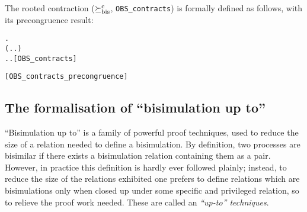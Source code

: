 The rooted contraction ($\mathrel{\succeq^{\rm{c}}_{\rm{bis}}}$, \texttt{OBS_contracts}) is formally
defined as follows, with its precongruence result:
\begin{alltt}
 \HOLSymConst{\HOLTokenObsContracts}  \HOLSymConst{\HOLTokenDefEquality{}}
  \HOLSymConst{\HOLTokenForall{}}.
      (\HOLSymConst{\HOLTokenForall{}}.  \HOLTokenTransBegin{}\HOLTokenTransEnd {} \HOLSymConst{\HOLTokenImp{}} \HOLSymConst{\HOLTokenExists{}}.  \HOLTokenTransBegin{}\HOLTokenTransEnd {} \HOLSymConst{\HOLTokenConj{}}  \HOLSymConst{\HOLTokenContracts{}} ) \HOLSymConst{\HOLTokenConj{}}
      \HOLSymConst{\HOLTokenForall{}}.  \HOLTokenTransBegin{}\HOLTokenTransEnd {} \HOLSymConst{\HOLTokenImp{}} \HOLSymConst{\HOLTokenExists{}}.  \HOLTokenWeakTransBegin{}\HOLTokenImp{}  \HOLSymConst{\HOLTokenConj{}}  \HOLSymConst{\HOLTokenWeakEQ} \hfill{[OBS_contracts]}

\HOLTokenTurnstile{}  \hfill{[OBS_contracts_precongruence]}
\end{alltt}

\subsection{The formalisation of ``bisimulation up to''}

``Bisimulation up to'' is a family of  powerful proof techniques,
used to reduce the size of a relation needed to define a bisimulation.
By definition, two processes are bisimilar if there exists a
bisimulation relation containing them as a pair. However, in practice
this definition is hardly ever followed plainly; instead, to reduce
the size of the relations exhibited one prefers to define relations
which are bisimulations only when closed up under some specific and
privileged relation, so to relieve the proof work needed. These are  called
 an \emph{``up-to'' techniques}. 



